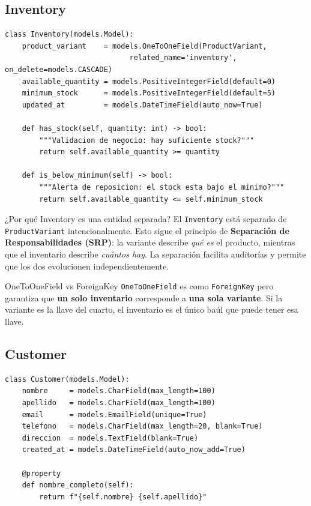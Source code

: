 \documentclass[12pt, a4paper]{article}
\begin{document}
\subsection{Inventory}

\begin{lstlisting}[caption={products/models.py -- Inventory con métodos de validación}]
class Inventory(models.Model):
    product_variant    = models.OneToOneField(ProductVariant,
                             related_name='inventory', on_delete=models.CASCADE)
    available_quantity = models.PositiveIntegerField(default=0)
    minimum_stock      = models.PositiveIntegerField(default=5)
    updated_at         = models.DateTimeField(auto_now=True)

    def has_stock(self, quantity: int) -> bool:
        """Validacion de negocio: hay suficiente stock?"""
        return self.available_quantity >= quantity

    def is_below_minimum(self) -> bool:
        """Alerta de reposicion: el stock esta bajo el minimo?"""
        return self.available_quantity <= self.minimum_stock
\end{lstlisting}

\begin{conceptbox}{¿Por qué Inventory es una entidad separada?}
El \texttt{Inventory} está separado de \texttt{ProductVariant} intencionalmente.
Esto sigue el principio de \textbf{Separación de Responsabilidades (SRP)}: la variante
describe \textit{qué es} el producto, mientras que el inventario describe
\textit{cuántos hay}. La separación facilita auditorías y permite que los dos
evolucionen independientemente.
\end{conceptbox}

\begin{tipbox}{OneToOneField vs ForeignKey}
\texttt{OneToOneField} es como \texttt{ForeignKey} pero garantiza que \textbf{un solo
inventario} corresponde a \textbf{una sola variante}. Si la variante es la llave
del cuarto, el inventario es el único baúl que puede tener esa llave.
\end{tipbox}

\subsection{Customer}

\begin{lstlisting}[caption={customers/models.py -- Cliente}]
class Customer(models.Model):
    nombre     = models.CharField(max_length=100)
    apellido   = models.CharField(max_length=100)
    email      = models.EmailField(unique=True)
    telefono   = models.CharField(max_length=20, blank=True)
    direccion  = models.TextField(blank=True)
    created_at = models.DateTimeField(auto_now_add=True)

    @property
    def nombre_completo(self):
        return f"{self.nombre} {self.apellido}"
\end{lstlisting}
\end{document}
